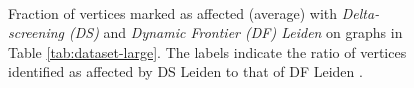 \begin{figure}[hbtp]
  \centering
   \\[-1ex]
  \caption{Fraction of vertices marked as affected (average) with \textit{Delta-screening (DS)} and \textit{Dynamic Frontier (DF) Leiden} on graphs in Table \ref{tab:dataset-large}. The labels indicate the ratio of vertices identified as affected by DS Leiden to that of DF Leiden .}
  \label{fig:8020-affected}
\end{figure}
